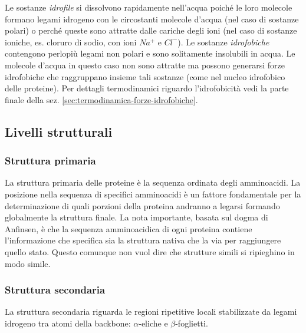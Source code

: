 {{\begin{itemize}
	Le sostanze \textit{idrofile} si dissolvono rapidamente nell'acqua poiché le loro molecole formano legami idrogeno con le circostanti molecole d'acqua (nel caso di sostanze polari) o perché queste sono attratte dalle cariche degli ioni (nel caso di sostanze ioniche, es. cloruro di sodio, con ioni $Na^{+}$ e $Cl^{-}$). Le sostanze \textit{idrofobiche} contengono perlopiù legami non polari e sono solitamente insolubili in acqua. Le molecole d'acqua in questo caso non sono attratte ma possono generarsi forze idrofobiche che raggruppano insieme tali sostanze (come nel nucleo idrofobico delle proteine). Per dettagli termodinamici riguardo l'idrofobicità vedi la parte finale della sez. \ref{sec:termodinamica-forze-idrofobiche}.
\end{itemize}
}

\subsection{Livelli strutturali}
\subsubsection{Struttura primaria}
La struttura primaria delle proteine è la sequenza ordinata degli amminoacidi. La posizione nella sequenza di specifici amminoacidi è un fattore fondamentale per la determinazione di quali porzioni della proteina andranno a legarsi formando globalmente la struttura finale. La nota importante, basata sul dogma di Anfinsen, è che la sequenza amminoacidica di ogni proteina contiene l'informazione che specifica sia la struttura nativa che la via per raggiungere quello stato. Questo comunque non vuol dire che strutture simili si ripieghino in modo simile.
	
\subsubsection{Struttura secondaria}
{
La struttura secondaria riguarda le regioni ripetitive locali stabilizzate da legami idrogeno tra atomi della backbone: $\alpha$-eliche e $\beta$-foglietti.

}}
